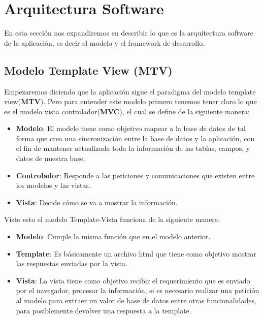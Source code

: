 \section{Arquitectura Software}
\label{2:sec2}

En esta sección nos expandiremos en describir lo que es la arquitectura software de la aplicación, es decir el modelo y el framework de desarrollo.\\


\subsection{Modelo Template View (MTV)}
Empezaremos diciendo que la aplicación sigue el paradigma del modelo template view(\textbf{MTV}).
Pero para entender este modelo primero tenemos tener claro lo que es el modelo vista controlador(\textbf{MVC}), el cual se define de la siguiente manera:\\

\begin{itemize}
  \item \textbf{Modelo}: El modelo tiene como objetivo mapear a la base de datos de tal forma que crea una sincronización
			  entre la base de datos y la aplicación, con el fin de mantener actualizada toda la información de 
			  las tablas, campos, y datos de nuestra base. 
  \item \textbf{Controlador}: Responde a las peticiones y comunicaciones que existen entre los modelos y las vistas.
  \item \textbf{Vista}: Decide cómo se va a mostrar la información. 
\end{itemize}

Visto esto el modelo Template-Vista funciona de la siguiente manera:\\


\begin{itemize}
  \item \textbf{Modelo}: Cumple la misma función que en el modelo anterior.
  \item \textbf{Template}: Es básicamente un archivo html que tiene como objetivo mostrar las respuestas enviadas por la vista.
  \item \textbf{Vista}: La vista tiene como objetivo recibir el requerimiento que es enviado por el navegador, procesar la información,
			 si es necesario realizar una petición al modelo para extraer un valor de base de datos entre otras funcionalidades, para posiblemente
			 devolver una respuesta a la template.
\end{itemize}



